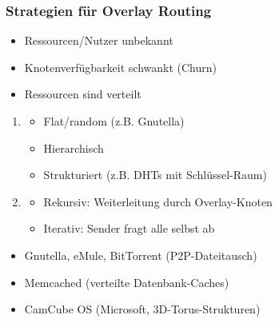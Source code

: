 \subsubsection*{Strategien für Overlay Routing}
\begin{itemize}
    \item Ressourcen/Nutzer unbekannt
    \item Knotenverfügbarkeit schwankt (Churn)
    \item Ressourcen sind verteilt
\end{itemize}
\begin{enumerate}
    \item {}
    \begin{itemize}
        \item Flat/random (z.B. Gnutella)
        \item Hierarchisch
        \item Strukturiert (z.B. DHTs mit Schlüssel-Raum)
    \end{itemize}
    \item {}
    \begin{itemize}
        \item Rekursiv: Weiterleitung durch Overlay-Knoten
        \item Iterativ: Sender fragt alle selbst ab
    \end{itemize}
\end{enumerate}
\begin{itemize}
    \item Gnutella, eMule, BitTorrent (P2P-Dateitausch)
    \item Memcached (verteilte Datenbank-Caches)
    \item CamCube OS (Microsoft, 3D-Torus-Strukturen)
\end{itemize}